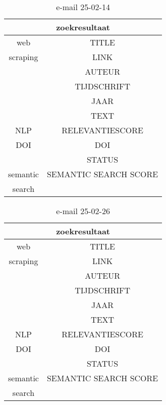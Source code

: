\begin{table}[h!]
    \caption{e-mail 25-02-14}
    \centering
    \begin{tabular}{|c|c|} 
        \hline
        \multicolumn{2}{|c|}{\textbf{zoekresultaat}} \\
        \hline
        web &TITLE\\
        scraping&LINK\\
        &AUTEUR\\
        &TIJDSCHRIFT\\
        &JAAR\\
        &TEXT\\
        \hline
        NLP&RELEVANTIESCORE\\
        \hline
        DOI&DOI\\
        &STATUS\\
        \hline
        semantic&SEMANTIC SEARCH SCORE\\
        search&\\
        \hline
    \end{tabular}
    \label{table:email20250214}
\end{table}
\begin{table}[h!]
    \caption{e-mail 25-02-26}
    \centering
    \begin{tabular}{|c|c|} 
        \hline
        \multicolumn{2}{|c|}{\textbf{zoekresultaat}} \\
        \hline
        web &TITLE\\
        scraping&LINK\\
        &AUTEUR\\
        &TIJDSCHRIFT\\
        &JAAR\\
        &TEXT\\
        \hline
        NLP&RELEVANTIESCORE\\
        \hline
        DOI&DOI\\
        &STATUS\\
        \hline
        semantic&SEMANTIC SEARCH SCORE\\
        search&\\
        \hline
    \end{tabular}
    \label{table:email20250226}
\end{table}
